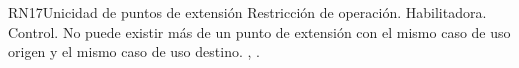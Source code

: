 

\begin{BussinesRule}{RN17}{Unicidad de puntos de extensión} 
	\BRitem[Tipo:] Restricción de operación. 
	\BRitem[Clase:] Habilitadora. 
	\BRitem[Nivel:] Control. %
	\BRitem[Descripción:] No puede existir más de un punto de extensión con el mismo caso de uso origen y el mismo caso de uso destino.
	 , . 
\end{BussinesRule}



